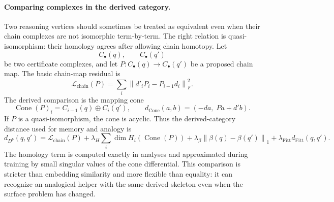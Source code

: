 \documentclass[11pt]{article}
\theoremstyle{definition}
\theoremstyle{plain}
\theoremstyle{remark}
\numberwithin{equation}{section}
\newcommand{\norm}[1]{\left\lVert #1\right\rVert}
\begin{document}
\paragraph{Comparing complexes in the derived category.}
Two reasoning vertices should sometimes be treated as equivalent even when their chain complexes are not isomorphic term-by-term.  The right relation is quasi-isomorphism: their homology agrees after allowing chain homotopy.  Let
\begin{equation}
  C_\bullet(q),\qquad C_\bullet(q')
\end{equation}
be two certificate complexes, and let $P:C_\bullet(q)\to C_\bullet(q')$ be a proposed chain map.  The basic chain-map residual is
\begin{equation}
  \mathcal L_{\mathrm{chain}}(P)
  =
  \sum_i\norm{d'_{i}P_i-P_{i-1}d_i}_F^2.
\end{equation}
The derived comparison is the mapping cone
\begin{equation}
  \operatorname{Cone}(P)_i=C_{i-1}(q)\oplus C_i(q'),
  \qquad
  d_{\operatorname{Cone}}(a,b)=(-d a,\; P a+d'b).
\end{equation}
If $P$ is a quasi-isomorphism, the cone is acyclic.  Thus the derived-category distance used for memory and analogy is
\begin{equation}
  d_{D^b}(q,q')
  =
  \mathcal L_{\mathrm{chain}}(P)
  +\lambda_H\sum_i \dim H_i(\operatorname{Cone}(P))
  +\lambda_\beta\norm{\beta(q)-\beta(q')}_1
  +\lambda_{\mathrm{Fitt}}d_{\mathrm{Fitt}}(q,q').
\end{equation}
The homology term is computed exactly in analyses and approximated during training by small singular values of the cone differential.  This comparison is stricter than embedding similarity and more flexible than equality: it can recognize an analogical helper with the same derived skeleton even when the surface problem has changed.
\end{document}
